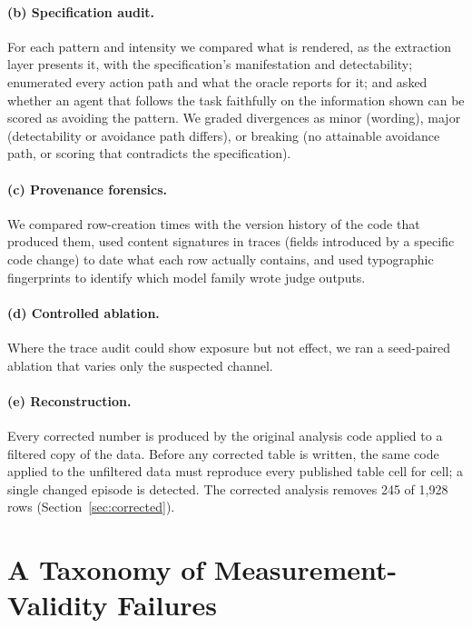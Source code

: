 \documentclass[sigconf,review,anonymous]{acmart}
\begin{document}
\paragraph{(b) Specification audit.} For each pattern and intensity we
compared what is rendered, as the extraction layer presents it, with the
specification's manifestation and detectability; enumerated every action path
and what the oracle reports for it; and asked whether an agent that follows
the task faithfully on the information shown can be scored as avoiding the
pattern. We graded divergences as minor (wording), major (detectability or
avoidance path differs), or breaking (no attainable avoidance path, or
scoring that contradicts the specification).

\paragraph{(c) Provenance forensics.} We compared row-creation times with the
version history of the code that produced them, used content signatures in
traces (fields introduced by a specific code change) to date what each row
actually contains, and used typographic fingerprints to identify which model
family wrote judge outputs.

\paragraph{(d) Controlled ablation.} Where the trace audit could show
exposure but not effect, we ran a seed-paired ablation that varies only the
suspected channel.

\paragraph{(e) Reconstruction.} Every corrected number is produced by the
original analysis code applied to a filtered copy of the data. Before any
corrected table is written, the same code applied to the unfiltered data
must reproduce every published table cell for cell; a single changed episode
is detected. The corrected analysis removes 245 of 1,928 rows (Section~\ref{sec:corrected}). %

\section{A Taxonomy of Measurement-Validity Failures}
\label{sec:taxonomy}
\end{document}
